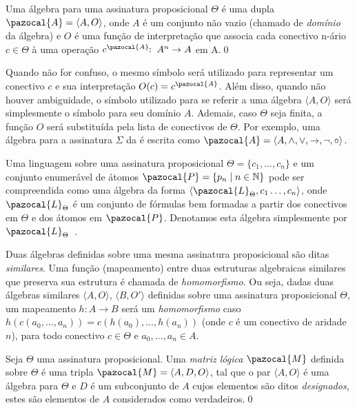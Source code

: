         \begin{definicao}
        \label{def:algebra}
            Uma álgebra para uma assinatura proposicional $\Theta$ é uma dupla $\pazocal{A} = \langle A, O \rangle$, onde $A$ é um conjunto não vazio (chamado de \textit{domínio} da álgebra) e $O$ é uma função de interpretação que associa cada conectivo n-ário $c \in \Theta$ à uma operação $c^{\pazocal{A}}\!\! : \; A^{n} \rightarrow A$ em A.\qed{}
        \end{definicao}

        Quando não for confuso, o mesmo símbolo será utilizado para representar um conectivo $c$ e sua interpretação $O(c) = c^{\pazocal{A}}$. Além disso, quando não houver ambiguidade, o símbolo utilizado para se referir a uma álgebra $\langle A, O \rangle$ será simplesmente o símbolo para seu domínio $A$. Ademais, caso $\Theta$ seja finita, a função $O$ será substituída pela lista de conectivos de $\Theta$. Por exemplo, uma álgebra para a assinatura $\Sigma$ da \lfium{} é escrita como $\pazocal{A} = \langle A,\land, \lor, \rightarrow, \neg, \circ \rangle$.

        \begin{observacao}
            Uma linguagem sobre uma assinatura proposicional $\Theta = \{c_{1}, \ldots, c_{n}\}$ e um conjunto enumerável de átomos $\pazocal{P} = \{p_{n} \; | \; n \in \mathbb{N} \}$ pode ser compreendida como uma álgebra da forma $\langle \pazocal{L}_{\Theta}, c_{1}\ldots, c_{n} \rangle$, onde $\pazocal{L}_{\Theta}$ é um conjunto de fórmulas bem formadas a partir dos conectivos em $\Theta$ e dos átomos em $\pazocal{P}$. Denotamos esta álgebra simplesmente por $\pazocal{L}_{\Theta}$~\cite{Sikorski1966-SIKAOF,Wojcicki1984-WJCLOP}.
        \end{observacao}

        Duas álgebras definidas sobre uma mesma assinatura proposicional são ditas \textit{similares}. Uma função (mapeamento) entre duas estruturas algebraicas similares que preserva sua estrutura é chamada de \textit{homomorfismo}. Ou seja, dadas duas álgebras similares $\langle A, O \rangle$, $\langle B, O' \rangle$ definidas sobre uma assinatura proposicional $\Theta$, um mapeamento $h : A \rightarrow B$ será um \textit{homomorfismo} caso $h(c(a_{0},\ldots, a_{n})) = c(h(a_{0}),\ldots, h(a_{n}))$ (onde $c$ é um conectivo de aridade $n$), para todo conectivo $c \in \Theta$ e $a_{0},\ldots,a_{n} \in A$.

        \begin{definicao}
            Seja $\Theta$ uma assinatura proposicional. Uma \textit{matriz lógica} $\pazocal{M}$ definida sobre $\Theta$ é uma tripla $\pazocal{M} = \langle A, D, O \rangle$, tal que o par $\langle A, O \rangle$ é uma álgebra para $\Theta$ e $D$ é um subconjunto de $A$ cujos elementos são ditos \textit{designados}, estes são elementos de $A$ considerados como verdadeiros.\qed{}
        \end{definicao}

